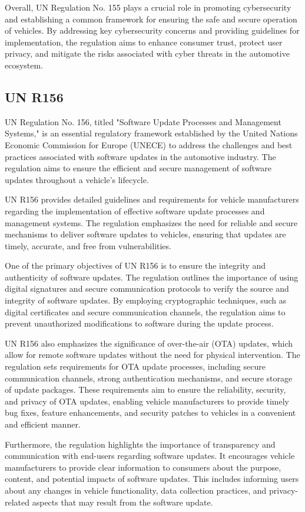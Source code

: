 \documentclass[
12pt,
oneside, 
onehalfspacing, 
nolistspacing, 
parskip, 
chapterinoneline, 
]{AASTCOMPUTER}
\begin{document}
Overall, UN Regulation No. 155 plays a crucial role in promoting cybersecurity and establishing a common framework for ensuring the safe and secure operation of vehicles. By addressing key cybersecurity concerns and providing guidelines for implementation, the regulation aims to enhance consumer trust, protect user privacy, and mitigate the risks associated with cyber threats in the automotive ecosystem.
\newpage
\subsection{UN R156}
UN Regulation No. 156, titled "Software Update Processes and Management Systems," \cite{UNR156} is an essential regulatory framework established by the United Nations Economic Commission for Europe (UNECE) to address the challenges and best practices associated with software updates in the automotive industry. The regulation aims to ensure the efficient and secure management of software updates throughout a vehicle's lifecycle.

UN R156 provides detailed guidelines and requirements for vehicle manufacturers regarding the implementation of effective software update processes and management systems. The regulation emphasizes the need for reliable and secure mechanisms to deliver software updates to vehicles, ensuring that updates are timely, accurate, and free from vulnerabilities.

One of the primary objectives of UN R156 is to ensure the integrity and authenticity of software updates. The regulation outlines the importance of using digital signatures and secure communication protocols to verify the source and integrity of software updates. By employing cryptographic techniques, such as digital certificates and secure communication channels, the regulation aims to prevent unauthorized modifications to software during the update process.

UN R156 also emphasizes the significance of over-the-air (OTA) updates, which allow for remote software updates without the need for physical intervention. The regulation sets requirements for OTA update processes, including secure communication channels, strong authentication mechanisms, and secure storage of update packages. These requirements aim to ensure the reliability, security, and privacy of OTA updates, enabling vehicle manufacturers to provide timely bug fixes, feature enhancements, and security patches to vehicles in a convenient and efficient manner.

Furthermore, the regulation highlights the importance of transparency and communication with end-users regarding software updates. It encourages vehicle manufacturers to provide clear information to consumers about the purpose, content, and potential impacts of software updates. This includes informing users about any changes in vehicle functionality, data collection practices, and privacy-related aspects that may result from the software update.
\end{document}
